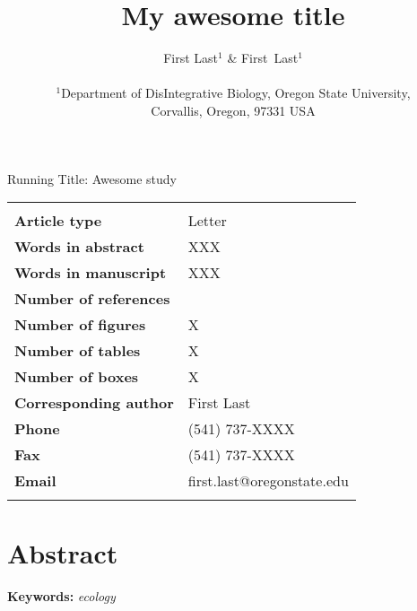\documentclass[11pt]{article}
\title{My awesome title}
\author
{First Last$^1$ \& First\ Last$^{1}$\\\\
\small{$^1$Department of DisIntegrative Biology, Oregon State University,}\\
\small{Corvallis, Oregon, 97331 USA}\\
}
\date{}
\newenvironment{ecolettabstract}{\clearpage\section*{Abstract}}{\clearpage}
\newenvironment{ecolettcover}{\maketitle}{\clearpage}
\begin{document}
\maketitle

\baselineskip30pt

 \begin{ecolettcover}

 \centerline{{\sc Running Title:} Awesome study}

 \bigskip

 \begin{center}
 \begin{tabular}{ll}
 \hline
 \\
 {\bf Article type}							 & Letter                               \\
 {\bf Words in abstract}				& XXX                                 \\
 {\bf Words in manuscript}       	 & XXX                               \\
 {\bf Number of references}			& \total{citnum}\                 \\
 {\bf Number of figures}				& X\                                  \\
 {\bf Number of tables}					& X\                                  \\
 {\bf Number of boxes}					& X\                                  \\
 {\bf Corresponding author}		   & First Last                    \\
 {\bf Phone} 								& (541) 737-XXXX               \\
 {\bf Fax} 									  & (541)  737-XXXX              \\
{\bf Email} 								& first.last@oregonstate.edu           \\
\\
 \hline
 \end{tabular}
 \end{center}

 \end{ecolettcover}



\begin{ecolettabstract}


\lipsum[1]

\noindent\textbf{Keywords:} \emph{ecology}
\end{ecolettabstract}
\end{document}
